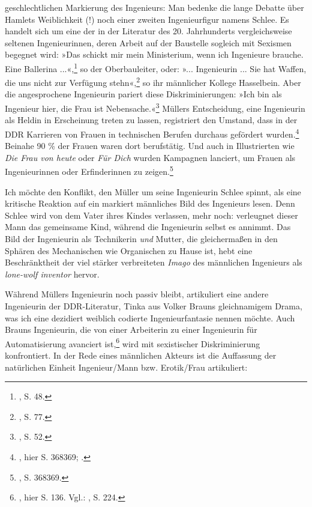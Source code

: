 \documentclass[%
	fontsize=10pt,%
	twoside,%
	headings=optiontoheadandtoc,%
	showtrims]{scrbook}
\renewenvironment{quote}{%
  \addmargin[\genericindent]{0pt}%
  \KOMAoptions{parskip=true}%
  \ifdim\parskip>0pt\else\addvspace{\intextsep}\fi
}{%
  \par
  \endaddmargin\vspace{\intextsep}
}
\begin{document}
geschlechtlichen Markierung des Ingenieurs: Man bedenke die lange Debatte über Hamlets Weiblichkeit (!) \textendash{} noch einer zweiten Ingenieurfigur namens Schlee. Es handelt sich um eine der in der Literatur des 20. Jahrhunderts vergleichsweise seltenen Ingenieurinnen, deren Arbeit auf der Baustelle sogleich mit Sexismen begegnet wird: »Das schickt mir mein Ministerium, wenn ich Ingenieure brauche. Eine Ballerina ...«,\footnote{\cite[][]{mueller1981a}, S. 48.}  so der Oberbauleiter, oder: »... Ingenieurin ... Sie hat Waffen, die uns nicht zur Verfügung stehn«,\footnote{\cite[][]{mueller1981a}, S. 77.}  so ihr männlicher Kollege Hasselbein. Aber die angesprochene Ingenieurin pariert diese Diskriminierungen: »Ich bin als Ingenieur hier, die Frau ist Nebensache.«\footnote{\cite[][]{mueller1981a}, S. 52.}  Müllers Entscheidung, eine Ingenieurin als Heldin in Erscheinung treten zu lassen, registriert den Umstand, dass in der DDR Karrieren von Frauen in technischen Berufen durchaus gefördert wurden.\footnote{\cite[][]{merkel1994a}, hier S. 368\textendash{}369; \cite[][]{gerhard1994a}.}  Beinahe 90 \% der Frauen waren dort berufstätig. Und auch in Illustrierten wie \emph{Die Frau von heute} oder \emph{Für Dich} wurden Kampagnen lanciert, um Frauen als Ingenieurinnen oder Erfinderinnen zu zeigen.\footnote{\cite[][]{merkel1994a}, S. 368\textendash{}369.} \par Ich möchte den Konflikt, den Müller um seine Ingenieurin Schlee spinnt, als eine kritische Reaktion auf ein markiert männliches Bild des Ingenieurs lesen. Denn Schlee wird von dem Vater ihres Kindes verlassen, mehr noch: verleugnet dieser Mann das gemeinsame Kind, während die Ingenieurin selbst es annimmt. Das Bild der Ingenieurin als Technikerin \emph{und} Mutter, die gleichermaßen in den Sphären des Mechanischen wie Organischen zu Hause ist, hebt eine Beschränktheit der viel stärker verbreiteten \emph{Imago} des männlichen Ingenieurs als \emph{lone-wolf inventor} hervor.\par Während Müllers Ingenieurin noch passiv bleibt, artikuliert eine andere Ingenieurin der DDR-Literatur, Tinka aus Volker Brauns gleichnamigem Drama, was ich eine dezidiert weiblich codierte Ingenieurfantasie nennen möchte. Auch Brauns In\-genieurin, die von einer Arbeiterin zu einer Ingenieurin für Automatisierung avanciert ist,\footnote{\cite[][]{braun1990a}, hier S. 136. Vgl.: \cite[][]{emmerich1996a}, S. 224.}  wird mit sexistischer Diskriminierung konfrontiert. In der Rede eines männlichen Akteurs ist die Auffassung der natürlichen Einheit Ingenieur/Mann bzw. Erotik/Frau artikuliert:\begin{quote}

\end{quote}
\end{document}
